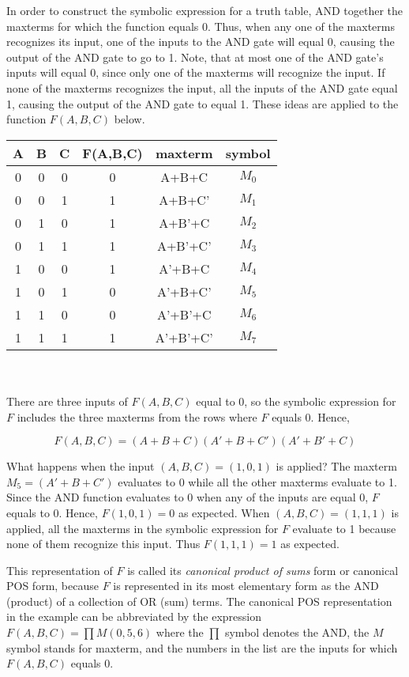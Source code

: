 In order to construct the symbolic expression for a truth table, 
AND together the maxterms for which the function equals 0. Thus, 
when any one of the maxterms recognizes its input, one of the 
inputs to the AND gate will equal 0, causing the output of the 
AND gate to go to 1.  Note, that at most one of the AND gate's 
inputs will equal 0, since only one of the maxterms will recognize 
the input.  If none of the maxterms recognizes the input, all the 
inputs of the AND gate equal 1, causing the output of the 
AND gate to equal 1.  These ideas are applied to 
the function $F(A,B,C)$ below.

\begin{tabular}{c|c|c||c|c|c}
A & B & C & F(A,B,C) & maxterm   & symbol \\ \hline
0 & 0 & 0 & 0        & A+B+C     & $M_0$   \\ \hline
0 & 0 & 1 & 1        & A+B+C'    & $M_1$   \\ \hline
0 & 1 & 0 & 1        & A+B'+C    & $M_2$   \\ \hline
0 & 1 & 1 & 1        & A+B'+C'   & $M_3$   \\ \hline
1 & 0 & 0 & 1        & A'+B+C    & $M_4$   \\ \hline
1 & 0 & 1 & 0        & A'+B+C'   & $M_5$   \\ \hline
1 & 1 & 0 & 0        & A'+B'+C   & $M_6$   \\ \hline
1 & 1 & 1 & 1        & A'+B'+C'  & $M_7$   \\ 
\end{tabular}
\\ \\
There are three inputs of $F(A,B,C)$ equal to 0, so the symbolic
expression for $F$ includes the three maxterms from the rows where
$F$ equals 0.  Hence, 

$$F(A,B,C) =  (A+B+C)(A'+B+C')(A'+B'+C)$$

What happens when the input $(A,B,C)=(1,0,1)$ is applied?  
The maxterm $M_5=(A'+B+C')$ evaluates to 0 while all the other maxterms 
evaluate to 1.  Since the AND function evaluates to 0 when any of 
the inputs are equal 0, $F$ equals to 0. Hence, $F(1,0,1)=0$ as
expected.  When $(A,B,C)=(1,1,1)$ is applied, all the
maxterms in the symbolic expression for $F$ evaluate to 1 because
none of them recognize this input.  Thus $F(1,1,1)=1$ as expected.

This representation of $F$ is called its \textit{canonical product of sums} 
form or canonical POS form, because $F$ is represented in its most
elementary form as the AND (product) of a collection of OR (sum) terms.  
The canonical POS representation in the example can be abbreviated by 
the expression $F(A,B,C) = \prod M(0,5,6)$  where the $\prod$
symbol denotes the AND, the $M$ symbol stands for maxterm, and the 
numbers in the list are the inputs for which $F(A,B,C)$ equals 0.

